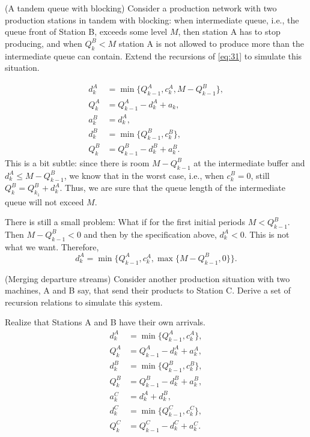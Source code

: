 \begin{question} (A tandem queue with blocking)
  Consider a production network with two production stations in tandem
  with blocking: when intermediate queue, i.e., the queue front of
  Station B, exceeds some level $M$, then station A has to stop
  producing, and when $Q^B_k < M$ station A is not allowed to produce
  more than the intermediate queue can contain. Extend the recursions
  of \eqref{eq:31} to simulate this situation.
\begin{solution}
\begin{equation}
  \begin{split}
    d^A_k &= \min\{Q_{k-1}^A, c_k^A, M-Q^B_{k-1}\}, \\
    Q_k^A &= Q_{k-1}^A -d_k^A + a_k, \\
    a_k^B &= d_{k}^A,\\
    d^B_k &= \min\{Q_{k-1}^B, c_k^B\}, \\
    Q_k^B &= Q_{k-1}^B -d_k^B + a_k^B.
  \end{split}
\end{equation}
This is a bit subtle: since there is room $M-Q^B_{k-1}$ at the
intermediate buffer and $d_k^A \leq M-Q^B_{k-1}$, we know that in the
worst case, i.e., when $c_k^B=0$, still $Q^B_k = Q_{k_1}^B +
d_k^A$.
Thus, we are sure that the queue length of the intermediate queue will
not exceed $M$.

There is still  a small problem: What if for the first initial periods  $M<Q^B_{k-1}$. Then $M-Q^B_{k-1}<0$ and then by the specification above, $d_k^A < 0$. This is not what we want. Therefore, 
\begin{equation*}
  d^A_k = \min\{Q_{k-1}^A, c_k^A, \max\{M-Q^B_{k-1}, 0\}\}.
\end{equation*}
\end{solution}
\end{question}

\begin{question} (Merging departure streams)
  Consider another production situation with two machines, A and B
  say, that send their products to Station C. Derive a set of
  recursion relations to simulate this system. 
\begin{solution}
Realize that Stations A and B have their own arrivals. 
\begin{equation}
  \begin{split}
    d^A_k &= \min\{Q_{k-1}^A, c_k^A\}, \\
    Q_k^A &= Q_{k-1}^A -d_k^A + a_k^A, \\
    d^B_k &= \min\{Q_{k-1}^B, c_k^B\}, \\
    Q_k^B &= Q_{k-1}^B -d_k^B + a_k^B, \\
    a_k^C &= d_{k}^A+d_{k}^B,\\
    d^C_k &= \min\{Q_{k-1}^C, c_k^C\}, \\
    Q_k^C &= Q_{k-1}^C -d_k^C + a_k^C.
  \end{split}
\end{equation}
\end{solution}
\end{question}


